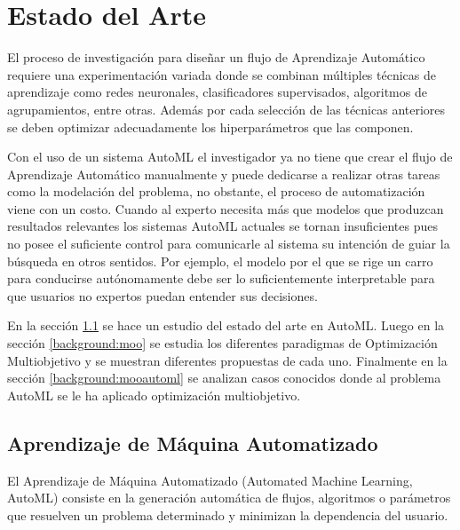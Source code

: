 \chapter{Estado del Arte}\label{chapter:state-of-the-art}
El proceso de investigaci\'on para dise\~nar un flujo de Aprendizaje Autom\'atico requiere una experimentaci\'on variada donde se combinan m\'ultiples t\'ecnicas de aprendizaje como redes neuronales, clasificadores supervisados, algoritmos de agrupamientos, entre otras. Adem\'as por cada selecci\'on de las t\'ecnicas anteriores se deben optimizar adecuadamente los hiperpar\'ametros que las componen.

Con el uso de un sistema AutoML el investigador ya no tiene que crear el flujo de Aprendizaje Autom\'atico manualmente y puede dedicarse a realizar otras tareas como la modelaci\'on del problema, no obstante, el proceso de automatizaci\'on viene con un costo. Cuando al experto necesita m\'as que modelos que produzcan resultados relevantes los sistemas AutoML actuales se tornan insuficientes pues no posee el suficiente control para comunicarle al sistema su intenci\'on de guiar la b\'usqueda en otros sentidos. Por ejemplo, el modelo por el que se rige un carro para conducirse aut\'onomamente debe ser lo suficientemente interpretable para que usuarios no expertos puedan entender sus decisiones.

En la secci\'on \ref{background:automl} se  hace un estudio del estado del arte en AutoML. Luego en la secci\'on \ref{background:moo} se estudia los diferentes paradigmas de Optimizaci\'on Multiobjetivo y se muestran diferentes propuestas de cada uno. Finalmente en la secci\'on \ref{background:mooautoml} se analizan casos conocidos donde al problema AutoML se le ha aplicado optimizaci\'on multiobjetivo.

\section{Aprendizaje de M\'aquina Automatizado}\label{background:automl}
El Aprendizaje de M\'aquina Automatizado (Automated Machine Learning, AutoML) consiste en la generaci\'on autom\'atica de flujos, algoritmos o par\'ametros que resuelven un problema determinado y minimizan la dependencia del usuario. 

